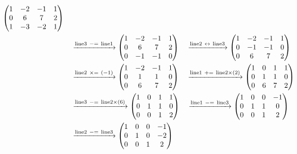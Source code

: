 \documentclass{ltjsarticle}
\begin{document}
\begin{align*}
\begin{pmatrix}
 1 & - 2 & -1 & 1\\
 0 & 6 & 7 & 2\\
 1 & - 3 & - 2 & 1
\end{pmatrix}\allowdisplaybreaks\\
&\ \ \ \xrightarrow{ \text{line} 3 \ -=\  \text{line} 1 } %
\begin{pmatrix}
 1 & - 2 & -1 & 1\\
 0 & 6 & 7 & 2\\
 0 & -1 & -1 & 0
\end{pmatrix}\ \ \ \xrightarrow{ \text{line} 2 \ \leftrightarrow\  \text{line} 3 } %
\begin{pmatrix}
 1 & - 2 & -1 & 1\\
 0 & -1 & -1 & 0\\
 0 & 6 & 7 & 2
\end{pmatrix}\allowdisplaybreaks\\
 &\ \ \ \xrightarrow{ \text{line} 2 \ \times=\ \left( - 1 \right)} %
\begin{pmatrix}
 1 & - 2 & -1 & 1\\
 0 & 1 & 1 & 0\\
 0 & 6 & 7 & 2
\end{pmatrix}\ \ \ \xrightarrow{ \text{line} 1 \ +=\  \text{line} 2 \times\left( 2 \right)} %
\begin{pmatrix}
 1 & 0 & 1 & 1\\
 0 & 1 & 1 & 0\\
 0 & 6 & 7 & 2
\end{pmatrix}\allowdisplaybreaks\\
 &\ \ \ \xrightarrow{ \text{line} 3 \ -=\  \text{line} 2 \times\left( 6 \right)} %
\begin{pmatrix}
 1 & 0 & 1 & 1\\
 0 & 1 & 1 & 0\\
 0 & 0 & 1 & 2
\end{pmatrix}\ \ \ \xrightarrow{ \text{line} 1 \ -=\  \text{line} 3 } %
\begin{pmatrix}
 1 & 0 & 0 & -1\\
 0 & 1 & 1 & 0\\
 0 & 0 & 1 & 2
\end{pmatrix}\allowdisplaybreaks\\
 &\ \ \ \xrightarrow{ \text{line} 2 \ -=\  \text{line} 3 } %
\begin{pmatrix}
 1 & 0 & 0 & -1\\
 0 & 1 & 0 & - 2\\
 0 & 0 & 1 & 2
\end{pmatrix}
\end{align*}
\end{document}
